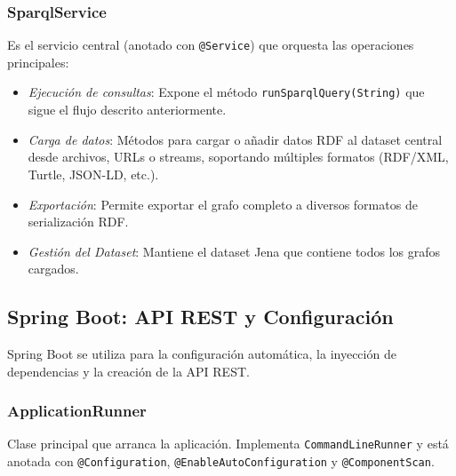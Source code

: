 \documentclass{article}
\begin{document}
\subsubsection{SparqlService}
Es el servicio central (anotado con \texttt{@Service}) que orquesta las operaciones principales:
\begin{itemize}
    \item \textit{Ejecución de consultas}: Expone el método \texttt{runSparqlQuery(String)} que sigue el flujo descrito anteriormente.
    \item \textit{Carga de datos}: Métodos para cargar o añadir datos RDF al dataset central desde archivos, URLs o streams, soportando múltiples formatos (RDF/XML, Turtle, JSON-LD, etc.).
    \item \textit{Exportación}: Permite exportar el grafo completo a diversos formatos de serialización RDF.
    \item \textit{Gestión del Dataset}: Mantiene el dataset Jena que contiene todos los grafos cargados.
\end{itemize}

\subsection{Spring Boot: API REST y Configuración}
Spring Boot se utiliza para la configuración automática, la inyección de dependencias y la creación de la API REST.

\subsubsection{ApplicationRunner}
Clase principal que arranca la aplicación. Implementa \texttt{CommandLineRunner} y está anotada con \texttt{@Configuration}, \texttt{@EnableAutoConfiguration} y \texttt{@ComponentScan}.
\end{document}
